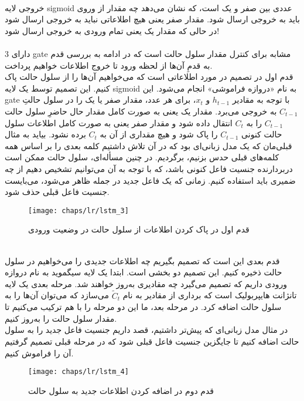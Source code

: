 \\
خروجی لایه \gls{sigmoid} عددی بین صفر و یک است، که نشان می‌دهد چه مقدار از وروی باید به خروجی ارسال شود. مقدار صفر یعنی هیچ اطلاعاتی نباید به خروجی ارسال شود در حالی که مقدار یک یعنی تمام ورودی به خروجی ارسال شود!
\\
\\
دارای 3 \gls{gate} مشابه برای کنترل مقدار سلول حالت است که در ادامه به بررسی قدم به قدمِ آن‌ها از لحظه ورود تا خروج اطلاعات خواهیم پرداخت.
\\
قدم اول در  تصمیم در مورد اطلاعاتی است که می‌خواهیم آن‌ها را از سلول حالت پاک کنیم. این تصمیم توسط یک لایه \gls{sigmoid} به نام «دروازه فراموشی» انجام می‌شود. این \gls{gate} با توجه به مقادیر $h_{t-1}$ و $x_t$، برای هر عدد، مقدار صفر یا یک را در سلول حالتِ $C_{t-1}$ به خروجی می‌برد. مقدار یک یعنی به صورت کامل مقدار حال حاضرِ سلول حالت $C_{t-1}$ را به $C_t$ انتقال داده شود و مقدار صفر یعنی به صورت کامل اطلاعات سلول حالت کنونی $C_{t-1}$ را پاک شود و هیچ مقداری از آن  به $C_t$ برده نشود. بیاید به مثال قبلی‌مان که یک مدل زبانی‌ای بود که در آن تلاش داشتیم کلمه بعدی را بر اساس همه کلمه‌های قبلی حدس بزنیم، برگردیم. در چنین مسأله‌ای، سلول حالت ممکن است دربردارنده جنسیت فاعل کنونی باشد، که با توجه به آن می‌توانیم تشخیص دهیم از چه ضمیری باید استفاده کنیم. زمانی که یک فاعل جدید در جمله ظاهر می‌شود، می‌بایست جنسیت فاعل قبلی حذف شود.
\begin{figure}[!ht]
	\centerline{\texttt{[image: chaps/lr/lstm\_3]}}
	\caption{
		قدم اول در پاک کردن اطلاعات از سلول حالت در وضعیت ورودی
	}
	\label{fig:ch_lr:lstm_3}
\end{figure} 
\\
قدم بعدی این است که تصمیم بگیریم چه اطلاعات جدیدی را می‌خواهیم در سلول حالت ذخیره کنیم. این تصمیم دو بخشی است. ابتدا یک لایه سیگموید به نام دروازه ورودی داریم که تصمیم می‌گیرد چه مقادیری به‌روز خواهند شد. مرحله بعدی یک لایه تانژانت هایپربولیک است که برداری از مقادیر به نام $\tilde{C}_t$ می‌سازد که می‌توان آن‌ها را به سلول حالت اضافه کرد. در مرحله بعد، ما این دو مرحله را با هم ترکیب می‌کنیم تا مقدار سلول حالت را به‌روز کنیم.
\\
در مثال مدل زبانی‌ای که پیش‌تر داشتیم، قصد داریم جنسیت فاعل جدید را به سلول حالت اضافه کنیم تا جایگزین جنسیت فاعل قبلی شود که در مرحله قبلی تصمیم گرفتیم آن را فراموش کنیم.
\begin{figure}[!ht]
	\centerline{\texttt{[image: chaps/lr/lstm\_4]}}
	\caption{
		قدم دوم در اضافه کردن اطلاعات جدید به سلول حالت
	}
	\label{fig:ch_lr:lstm_4}
\end{figure} 
